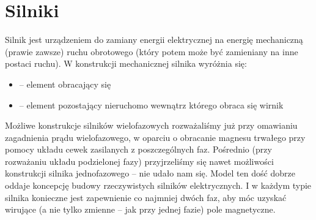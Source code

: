 % 
% 
% 
% 

\section{Silniki}

Silnik jest urządzeniem do zamiany energii elektrycznej na energię mechaniczną (prawie zawsze) ruchu obrotowego (który potem może być zamieniany na inne postaci ruchu).
W konstrukcji mechanicznej silnika wyróżnia się:
\begin{itemize}
	\item {} – element obracający się
	\item {} – element pozostający nieruchomo wewnątrz którego obraca się wirnik
\end{itemize}

Możliwe konstrukcje silników wielofazowych rozważaliśmy już przy omawianiu zagadnienia prądu wielofazowego, w oparciu o obracanie magnesu trwałego przy pomocy układu cewek zasilanych z poszczególnych faz.
Pośrednio (przy rozważaniu układu podzielonej fazy) przyjrzeliśmy się nawet możliwości konstrukcji silnika jednofazowego – nie udało nam się.
Model ten dość dobrze oddaje koncepcję budowy rzeczywistych silników elektrycznych.
I w każdym typie silnika konieczne jest zapewnienie co najmniej dwóch faz, aby móc uzyskać wirujące (a nie tylko zmienne – jak przy jednej fazie) pole magnetyczne.

